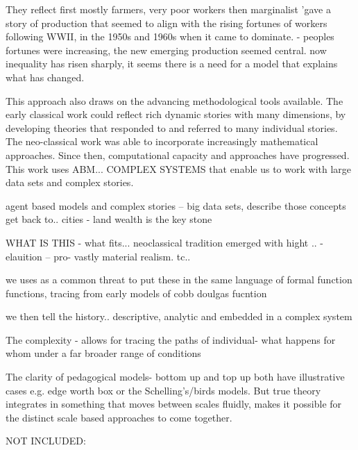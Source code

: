 They reflect
first mostly farmers, very poor workers
then marginalist  'gave a story of production that seemed to align with the rising fortunes of workers following WWII, in the 1950s and 1960s when it came to dominate. - peoples fortunes were increasing, the new emerging production seemed central.
now inequality has risen sharply, it seems there is a need for a model that explains what has changed.

This approach also draws on the advancing methodological tools available. The early classical work could reflect rich dynamic stories with many dimensions, by developing theories that responded to and referred to many individual stories. The neo-classical work was able to incorporate increasingly mathematical approaches. Since then, computational capacity and approaches have progressed. This work uses ABM... COMPLEX SYSTEMS that enable us to work with large data sets and complex stories. 


agent based models and complex stories
-- big data sets, describe those concepts get back to..
cities - land wealth is the key stone

WHAT IS THIS - what fits...
neoclassical tradition emerged with hight ..
- elauition -- pro- vastly material realism. tc..

we uses as a common threat to put these in the same language of formal function functions, tracing from early models of cobb doulgas fucntion

we then tell the history..  
descriptive, analytic and embedded in a complex system


The complexity - allows for tracing the paths of individual- what happens for whom under a far broader range of conditions

The clarity of pedagogical models- bottom up and top up both have illustrative cases e.g. edge worth box or the Schelling's/birds models.
But true theory integrates in something that moves between scales fluidly, makes it possible for the distinct scale based approaches to come together.


NOT INCLUDED:





